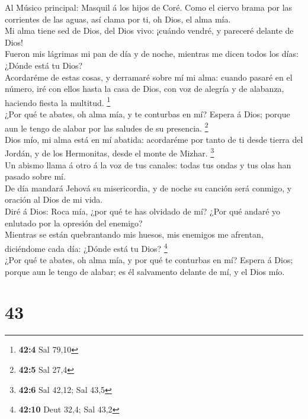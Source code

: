  Al Músico principal: Masquil á los hijos de Coré. Como el
ciervo brama por las corrientes de las aguas, así clama por ti, oh Dios,
el alma mía.\\
 Mi alma tiene sed de Dios, del Dios vivo: ¡cuándo vendré, y
pareceré delante de Dios!\\
 Fueron mis lágrimas mi pan de día y de noche, mientras me
dicen todos los días: ¿Dónde está tu Dios?\\
 Acordaréme de estas cosas, y derramaré sobre mí mi alma:
cuando pasaré en el número, iré con ellos hasta la casa de Dios, con voz
de alegría y de alabanza, haciendo fiesta la multitud. \footnote{\textbf{42:4}
  Sal 79,10}\\
 ¿Por qué te abates, oh alma mía, y te conturbas en mí?
Espera á Dios; porque aun le tengo de alabar por las saludes de su
presencia. \footnote{\textbf{42:5} Sal 27,4}\\
 Dios mío, mi alma está en mí abatida: acordaréme por tanto
de ti desde tierra del Jordán, y de los Hermonitas, desde el monte de
Mizhar. \footnote{\textbf{42:6} Sal 42,12; Sal 43,5}\\
 Un abismo llama á otro á la voz de tus canales: todas tus
ondas y tus olas han pasado sobre mí.\\
 De día mandará Jehová su misericordia, y de noche su
canción será conmigo, y oración al Dios de mi vida.\\
 Diré á Dios: Roca mía, ¿por qué te has olvidado de mí? ¿Por
qué andaré yo enlutado por la opresión del enemigo?\\
 Mientras se están quebrantando mis huesos, mis enemigos me
afrentan, diciéndome cada día: ¿Dónde está tu Dios? \footnote{\textbf{42:10}
  Deut 32,4; Sal 43,2}\\
 ¿Por qué te abates, oh alma mía, y por qué te conturbas en
mí? Espera á Dios; porque aun le tengo de alabar; es él salvamento
delante de mí, y el Dios mío.

\hypertarget{section-42}{%
\section{43}\label{section-42}}

